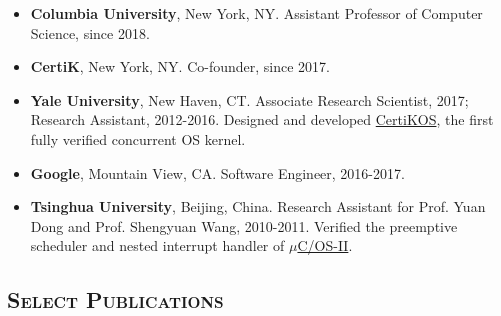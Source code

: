 \documentclass[10pt]{article}
\renewcommand{\section}[1]{
	\vspace{-5pt}
   	\subsection*{\scshape  \bfseries #1}
   }
\newenvironment{innerlist}[1][\enskip\textbullet]%
        {\begin{itemize}[#1,leftmargin=25pt,parsep=0pt,itemsep=2pt,topsep=2pt,partopsep=0pt]}
        {\end{itemize}}
\newcommand\columbia{\textbf{Columbia University}}
\newcommand\yale{\textbf{Yale University}}
\newcommand\tsinghua{\textbf{Tsinghua University}}
\begin{document}
\begin{innerlist}
\item[]  \columbia{}, New York, NY. Assistant Professor of Computer Science, since 2018.

\vspace{0.05in}

\item[] \textbf{CertiK}, New York, NY. Co-founder, since 2017.

\vspace{0.05in}

\item[] \yale, New Haven, CT. Associate Research Scientist, 2017; Research Assistant, 2012-2016.
Designed and developed \href{http://flint.cs.yale.edu/certikos/}{CertiKOS}, 
the first fully verified concurrent OS kernel.

\vspace{0.05in}

\item[] \textbf{Google}, Mountain View, CA. Software Engineer, 2016-2017.

\vspace{0.05in}

\item[]  \tsinghua{}, Beijing, China. Research Assistant for Prof. Yuan Dong and Prof. Shengyuan Wang, 2010-2011. Verified the preemptive scheduler and nested interrupt handler
of \href{http://micrium.com/rtos/ucosii/overview/}{$\mu$C/OS-II}.

\end{innerlist}



\section{Select Publications}
\end{document}
